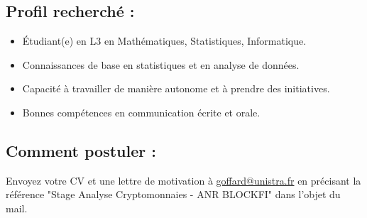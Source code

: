 \documentclass[a4paper,12pt]{article}
\begin{document}
\subsection*{Profil recherché :}

\begin{itemize}
    \item Étudiant(e) en L3 en Mathématiques, Statistiques, Informatique.
    \item Connaissances de base en statistiques et en analyse de données.
    \item Capacité à travailler de manière autonome et à prendre des initiatives.
    \item Bonnes compétences en communication écrite et orale.
\end{itemize}

\subsection*{Comment postuler :}

Envoyez votre CV et une lettre de motivation à \href{mailto:goffard@unistra.fr}{goffard@unistra.fr} en précisant la référence "Stage Analyse Cryptomonnaies - ANR BLOCKFI" dans l'objet du mail.
\end{document}
